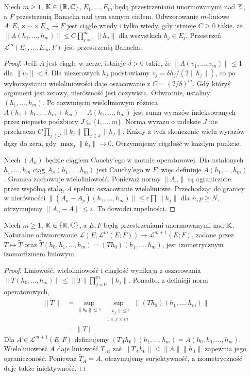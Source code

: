 \begin{stwierdzenie}
\label{prop:multi-banach15}
Niech $m\ge1$, $\mathbb K\in\{\mathbb R,\mathbb C\}$, $E_1,\ldots,E_m$ będą przestrzeniami unormowanymi nad $\mathbb K$, a $F$ przestrzenią Banacha nad tym samym ciałem. Odwzorowanie $m$-liniowe $A:E_1\times\cdots\times E_m\to F$ jest ciągłe wtedy i tylko wtedy, gdy istnieje $C\ge0$ takie, że
$\|A(h_1,\ldots,h_m)\|\le C\prod_{j=1}^m\|h_j\|$ dla wszystkich $h_j\in E_j$. Przestrzeń $\mathcal L^m(E_1,\ldots,E_m;F)$ jest przestrzenią Banacha.
\end{stwierdzenie}
\begin{proof}
Jeśli $A$ jest ciągłe w zerze, istnieje $\delta>0$ takie, że $\|A(v_1,\ldots,v_m)\|\le1$ dla $\|v_j\|<\delta$. Dla niezerowych $h_j$ podstawiamy $v_j=\delta h_j/(2\|h_j\|)$, co po wykorzystaniu wieloliniowości daje oszacowanie z $C=(2/\delta)^m$. Gdy któryś argument jest zerowy, nierówność jest oczywista. Odwrotnie, ustalmy $(h_1,\ldots,h_m)$. Po rozwinięciu wieloliniowym różnica $A(h_1+k_1,\ldots,h_m+k_m)-A(h_1,\ldots,h_m)$ jest sumą wyrazów indeksowanych przez niepuste podzbiory $J\subseteq\{1,\ldots,m\}$. Norma wyrazu o indeksie $J$ nie przekracza $C\prod_{j\in J}\|k_j\|\prod_{j\notin J}\|h_j\|$. Każdy z tych skończenie wielu wyrazów dąży do zera, gdy $\max_j\|k_j\|\to0$. Otrzymujemy ciągłość w każdym punkcie.

Niech $(A_n)$ będzie ciągiem Cauchy'ego w normie operatorowej. Dla ustalonych $h_1,\ldots,h_m$ ciąg $A_n(h_1,\ldots,h_m)$ jest Cauchy'ego w $F$, więc definiuje $A(h_1,\ldots,h_m)$. Granica zachowuje wieloliniowość. Ponieważ normy $\|A_n\|$ są ograniczone przez wspólną stałą, $A$ spełnia oszacowanie wieloliniowe. Przechodząc do granicy w nierówności $\|(A_n-A_p)(h_1,\ldots,h_m)\|\le\varepsilon\prod\|h_j\|$ dla $n,p\ge N$, otrzymujemy $\|A_n-A\|\le\varepsilon$. To dowodzi zupełności.
\end{proof}

\begin{lemat}
\label{lem:currying15}
Niech $m\ge1$, $\mathbb K\in\{\mathbb R,\mathbb C\}$, a $E,F$ będą przestrzeniami unormowanymi nad $\mathbb K$. Naturalne odwzorowanie
$\mathcal L(E,\mathcal L^m(E;F))\to\mathcal L^{m+1}(E;F)$, zadane przez $T\mapsto\widetilde T$ oraz $\widetilde T(h_0,h_1,\ldots,h_m)=(Th_0)(h_1,\ldots,h_m)$, jest izometrycznym izomorfizmem liniowym.
\end{lemat}
\begin{proof}
Liniowość, wieloliniowość i ciągłość wynikają z oszacowania $\|\widetilde T(h_0,\ldots,h_m)\|\le\|T\|\prod_{j=0}^m\|h_j\|$. Ponadto, z definicji norm operatorowych,
\[
\begin{aligned}
\|\widetilde T\|&=\sup_{\|h_0\|\le1}\sup_{\substack{\|h_j\|\le1\\1\le j\le m}}\|(Th_0)(h_1,\ldots,h_m)\|\\
&=\|T\|.
\end{aligned}
\]
Dla $A\in\mathcal L^{m+1}(E;F)$ definiujemy $(T_Ah_0)(h_1,\ldots,h_m)=A(h_0,h_1,\ldots,h_m)$. Wieloliniowość $A$ daje liniowość $T_A$, zaś $\|T_Ah_0\|\le\|A\|\|h_0\|$ zapewnia jego ograniczoność. Ponieważ $\widetilde T_A=A$, otrzymujemy surjektywność, a izometryczność daje także iniektywność.
\end{proof}

